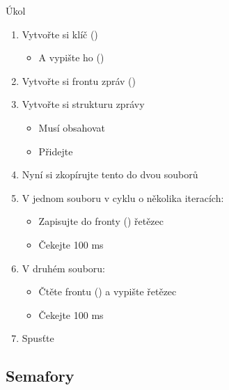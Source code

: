 \begin{frame}{Úkol}

  \begin{enumerate}
    \item Vytvořte si klíč ()
    \begin{itemize}
      \item A vypište ho ()
    \end{itemize}

    \item Vytvořte si frontu zpráv ()
    \item Vytvořte si strukturu zprávy
    \begin{itemize}
      \item Musí obsahovat 
      \item Přidejte 
    \end{itemize}

    \item Nyní si zkopírujte tento  do dvou souborů
    \item V jednom souboru v cyklu o několika iteracích:
    \begin{itemize}
      \item Zapisujte do fronty () řetězec
      \item Čekejte 100 ms
    \end{itemize}

    \item V druhém souboru:
    \begin{itemize}
      \item Čtěte frontu () a vypište řetězec
      \item Čekejte 100 ms
    \end{itemize}

    \item Spusťte
  \end{enumerate}

\end{frame}

\iffimuni
\subsection{Semafory}
\fi

